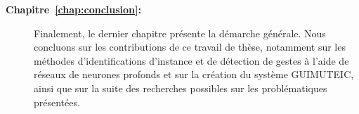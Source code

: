 \begin{description}
	\item[\textbf{Chapitre~\ref{chap:conclusion}:~}] Finalement, le dernier chapitre présente la démarche générale. Nous concluons sur les contributions de ce travail de thèse, notamment sur les méthodes d'identifications d'instance et de détection de gestes à l'aide de réseaux de neurones profonds et sur la création du système GUIMUTEIC, ainsi que sur la suite des recherches possibles sur les problématiques présentées.

\end{description}




